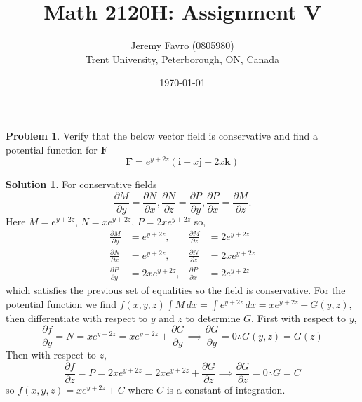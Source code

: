 \documentclass[10pt]{article}
\title{Math 2120H: Assignment V}
\author{Jeremy Favro (0805980) \\ Trent University, Peterborough, ON, Canada}
\date{\today}
\theoremstyle{definition}
\newtheorem{problem}{Problem}
\newtheorem{soln}{Solution}
\newcommand{\ui}{\mathbf{i}}
\newcommand{\uj}{\mathbf{j}}
\newcommand{\uk}{\mathbf{k}}
\begin{document}
\maketitle

\begin{problem}
Verify that the below vector field is conservative and find a potential function for $\mathbf{F}$
$$\mathbf{F}=e^{y+2z}\left(\ui+x\uj+2x\uk\right)$$
\end{problem}
\begin{soln}
  For conservative fields
  $$\frac{\partial M}{\partial y}=\frac{\partial N}{\partial x},
    \frac{\partial N}{\partial z}=\frac{\partial P}{\partial y},
    \frac{\partial P}{\partial x}=\frac{\partial M}{\partial z}.
  $$
  Here $M=e^{y+2z}$, $N=xe^{y+2z}$, $P=2xe^{y+2z}$ so,
  \begin{align*}
    \frac{\partial M}{\partial y} & =e^{y+2z},
                                  & \frac{\partial M}{\partial z} & =2e^{y+2z}  \\
    \frac{\partial N}{\partial x} & =e^{y+2z},
                                  & \frac{\partial N}{\partial z} & =2xe^{y+2z} \\
    \frac{\partial P}{\partial y} & =2xe^{y+2z},
                                  & \frac{\partial P}{\partial x} & =2e^{y+2z}
  \end{align*}
  which satisfies the previous set of equalities so the field is conservative. For the potential function we find
  $f(x,y,z)\int M\,dx=\int e^{y+2z}\,dx=xe^{y+2z}+G(y,z)$, then differentiate with respect to $y$ and $z$ to determine
  $G$. First with respect to $y$,
  $$\frac{\partial f}{\partial y}=N=xe^{y+2z}=xe^{y+2z}+\frac{\partial G}{\partial y}\implies \frac{\partial G}{\partial y}=0\therefore G(y,z)=G(z)$$
  Then with respect to $z$,
  $$\frac{\partial f}{\partial z}=P=2xe^{y+2z}=2xe^{y+2z}+\frac{\partial G}{\partial z}\implies \frac{\partial G}{\partial z}=0\therefore G=C$$
  so $f(x,y,z)=xe^{y+2z}+C$ where $C$ is a constant of integration.
\end{soln}
\end{document}
